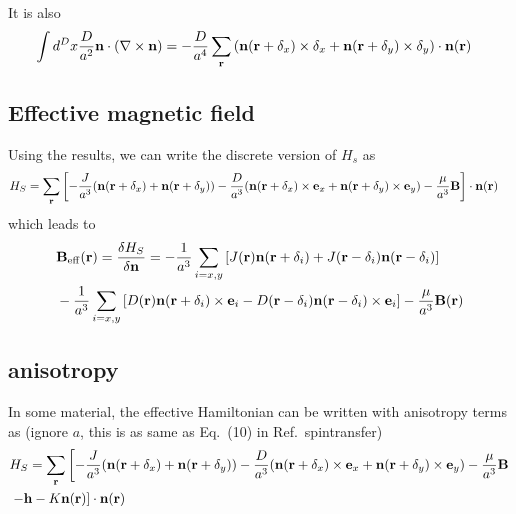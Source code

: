 \documentclass[aps,superscriptaddress,groupedaddress]{revtex4}  %
\begin{document}
It is also
\begin{equation}
\begin{split}
&\int d^D x\frac{D}{a^2}{\bf n}\cdot (\nabla \times {\bf n})=-\frac{D}{a^4}\sum _{{\bf r}}\left({\bf n}({\bf r}+\delta _x)\times \delta _x+{\bf n}({\bf r}+\delta _y)\times \delta _y\right)\cdot {\bf n}({\bf r})
\end{split}
\end{equation}

\subsection{\label{sec:2.4}Effective magnetic field}

Using the results, we can write the discrete version of $H_s$ as
\begin{equation}
\begin{split}
&H_S=\sum _{{\bf r}}\left[-\frac{J}{a^3} ({\bf n}({\bf r}+\delta_x)+{\bf n}({\bf r}+\delta_y))-\frac{D}{a^3}  ({\bf n}({\bf r}+\delta_x)\times {{\bf e}}_x+{\bf n}({\bf r}+\delta_y)\times {{\bf e}}_y)-\frac{\mu}{a^3}{\bf B}\right]\cdot {\bf n}({\bf r})
\end{split}
\end{equation}
which leads to
\begin{equation}
\begin{split}
&{\bf B}_{\rm eff}({\bf r})=\frac{\delta H_S}{\delta {\bf n}}=-\frac{1}{a^3} \sum _{i=x,y}\left[J({\bf r}){\bf n}({\bf r}+\delta_i)+J({\bf r}-\delta_i){\bf n}({\bf r}-\delta_i)\right]\\
&-\frac{1}{a^3}  \sum _{i=x,y}\left[D({\bf r}){\bf n}({\bf r}+\delta_i)\times {{\bf e}}_i-D({\bf r}-\delta _i){\bf n}({\bf r}-\delta_i)\times {{\bf e}}_i\right]-\frac{\mu}{a^3}{\bf B}({\bf r})
\end{split}
\end{equation}

\subsection{\label{sec:2.5}anisotropy}

In some material, the effective Hamiltonian can be written with anisotropy terms as (ignore $a$, this is as same as Eq.~(10) in Ref.~{spintransfer})
\begin{equation}
\begin{split}
&H_S=\sum _{{\bf r}}\left[-\frac{J}{a^3} ({\bf n}({\bf r}+\delta_x)+{\bf n}({\bf r}+\delta_y))-\frac{D}{a^3}  ({\bf n}({\bf r}+\delta_x)\times {{\bf e}}_x+{\bf n}({\bf r}+\delta_y)\times {{\bf e}}_y)-\frac{\mu}{a^3}{\bf B}\right.\\
&\left.-{\bf h}-K{\bf n}({\bf r})\right]\cdot {\bf n}({\bf r})
\end{split}
\end{equation}
\end{document}
